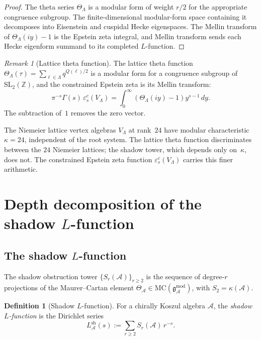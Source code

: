 \documentclass[11pt,reqno]{amsart}
\theoremstyle{definition}
\newtheorem{definition}[theorem]{Definition}
\theoremstyle{remark}
\newtheorem{remark}[theorem]{Remark}
\providecommand{\cA}{\mathcal{A}}
\providecommand{\bZ}{\mathbb{Z}}
\providecommand{\MC}{\mathrm{MC}}
\providecommand{\sh}{\mathrm{sh}}
\providecommand{\gmod}{\mathfrak{g}^{\mathrm{mod}}_\cA}
\numberwithin{equation}{section}
\begin{document}
\begin{proof}
  The theta series $\Theta_\Lambda$ is a modular form of weight
  $r/2$ for the appropriate congruence subgroup. The finite-dimensional
  modular-form space containing it decomposes into Eisenstein and
  cuspidal Hecke eigenspaces. The Mellin transform of
  $\Theta_\Lambda(iy)-1$ is the Epstein zeta integral, and Mellin
  transform sends each Hecke eigenform summand to its completed
  $L$-function.
\end{proof}

\begin{remark}[Lattice theta function]
  \label{rem:lattice-theta}
  The lattice theta function
  $\Theta_\Lambda(\tau) = \sum_{\ell \in \Lambda}
  q^{Q(\ell)/2}$ is a modular form for a congruence subgroup
  of~$\mathrm{SL}_2(\bZ)$, and the constrained Epstein zeta is
  its Mellin transform:
  \[
  \pi^{-s}\Gamma(s)\,\varepsilon^c_s(V_\Lambda)
  =
  \int_0^\infty(\Theta_\Lambda(iy)-1)y^{s-1}\,dy .
  \]
  The subtraction of~$1$ removes the zero vector.
\end{remark}

The Niemeier lattice vertex algebras $V_\Lambda$ at rank~$24$ have
modular characteristic $\kappa = 24$, independent of the root
system. The lattice theta function discriminates between the
$24$ Niemeier lattices; the shadow tower, which depends only
on~$\kappa$, does not. The constrained Epstein zeta function
$\varepsilon^c_s(V_\Lambda)$ carries this finer arithmetic.


\section{Depth decomposition of the shadow $L$-function}
\label{sec:depth-decomposition}

\subsection{The shadow $L$-function}

The shadow obstruction tower $\{S_r(\cA)\}_{r \ge 2}$ is the
sequence of degree-$r$ projections of the Maurer--Cartan element
$\Theta_\cA \in \MC(\gmod)$, with $S_2 = \kappa(\cA)$.

\begin{definition}[Shadow $L$-function]\label{def:shadow-L}
  For a chirally Koszul algebra $\cA$, the \emph{shadow $L$-function}
  is the Dirichlet series
  \begin{equation}\label{eq:shadow-L}
    L^{\sh}_\cA(s)
    := \sum_{r \ge 2} S_r(\cA)\, r^{-s}.
  \end{equation}
\end{definition}
\end{document}
